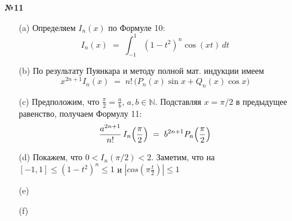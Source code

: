 \documentclass[a4paper]{article}
\renewcommand{\f}[2]{\frac{#1}{#2}}
\renewcommand{\leq}{\leqslant}
\begin{document}
\begin{enumerate}
  \item[\textbf{№11}]
  \begin{enumerate}
    \item[(a)]Определяем $I_n(x)$ по Формуле 10:
    \[
    I_n(x) \;=\;\int_{-1}^{1}(1 - t^2)^n\cos(xt)\,dt 
    \]
    \item[(b)]По результату Пуянкара и методу полной мат. индукции имеем
    \[
    x^{2n+1}I_n(x) \;=\; n!\,\bigl(P_n(x)\sin x + Q_n(x)\cos x\bigr)
    \]
    \item[(c)]Предположим, что \(\displaystyle\frac\pi2=\frac ab\), \(a,b\in\mathbb N\). 
    Подставляя $x=\pi/2$ в предыдущее равенство, получаем Формулу 11:
    \[
    \frac{a^{2n+1}}{n!}\,I_n\Bigl(\frac\pi2\Bigr)
    \;=\;b^{2n+1}P_n\Bigl(\frac\pi2\Bigr)
    \]
    \item[(d)]Покажем, что $0< I_n(\pi/2)<2$. Заметим, что на
     $[−1,1] \leq (1−t^2)^n\leq 1$ и $|cos(\pi \f{t}{2})|\leq 1$
    \item[(e)]
    \item[(f)]
  \end{enumerate}

\end{enumerate}
\end{document}
